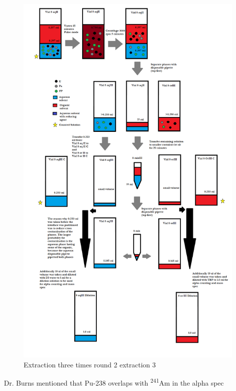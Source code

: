 \documentclass[idxtotoc,hyperref,openany,oneside]{labbook} %
\newcommand{\tss}{\textsuperscript}
\begin{document}
\begin{figure}[H] %
\begin{center}
  \includegraphics[width=0.8\linewidth]
                  {Figures/Cycle_x3_round_2_extraction_3}
\end{center}
\caption{Extraction three times round 2 extraction 3}
\label{fig:round2_extraction3}
\end{figure}



\begin{todolist}
\item{Dr. Burns mentioned that Pu-238 overlaps with
  \tss{241}Am in the alpha spec}
\end{todolist}




\end{document}
